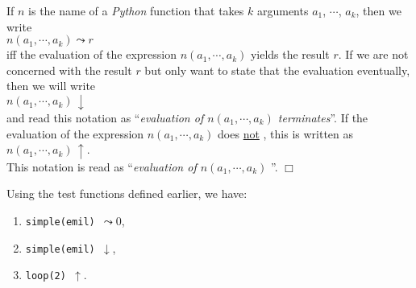\begin{Notation}[$\leadsto$, $\downarrow$, $\uparrow$]
If $n$ is the name of a \textsl{Python} function that takes $k$ arguments $a_1$, $\cdots$, $a_k$,
then we write 
\\[0.2cm]
\hspace*{1.3cm}
 $n(a_1, \cdots, a_k) \leadsto r$ 
\\[0.2cm]
iff the evaluation of the expression $n(a_1, \cdots, a_k)$ yields the result $r$.  If we are not
concerned with the result $r$ but only want to state that the evaluation  eventually,
then we will write
\\[0.2cm]
\hspace*{1.3cm} $n(a_1, \cdots, a_k) \,\downarrow$ \\[0.3cm]
and read this notation as ``\emph{evaluation of $n(a_1, \cdots, a_k)$ terminates}''.
If the evaluation of the expression $n(a_1, \cdots, a_k)$ does \underline{not} , this is
written as \\[0.2cm]
\hspace*{1.3cm}
 $n(a_1, \cdots, a_k) \,\uparrow$. 
\\[0.2cm]
This notation is read as ``\emph{evaluation of $n(a_1, \cdots, a_k)$ }''.
\hspace*{\fill} $\Box$
\end{Notation}

\examplesEng  Using the test functions defined earlier, we have:
\begin{enumerate}
\item {\tt simple(emil) $\leadsto 0$},
\item {\tt simple(emil) $\downarrow$},
\item {\tt loop(2) $\uparrow$}.
\end{enumerate}

